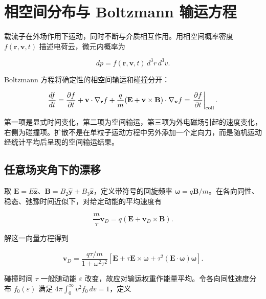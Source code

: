 \documentclass[
  11pt,
  a4paper,
  oneside,
  openany]{report}
\numberwithin{equation}{chapter}
\begin{document}
\section{相空间分布与 Boltzmann
输运方程}\label{ux76f8ux7a7aux95f4ux5206ux5e03ux4e0e-boltzmann-ux8f93ux8fd0ux65b9ux7a0b}

载流子在外场作用下运动，同时不断与介质相互作用。用相空间概率密度
\(f(\mathbf r,\mathbf v,t)\) 描述电荷云，微元内概率为

\begin{equation}
dp=f(\mathbf r,\mathbf v,t)\,d^3r\,d^3v.
\end{equation}

Boltzmann 方程将确定性的相空间输运和碰撞分开：

\begin{equation}
\frac{df}{dt}=\frac{\partial f}{\partial t}
+\mathbf v\cdot\nabla_{\mathbf r}f
+\frac{q}{m}(\mathbf E+\mathbf v\times\mathbf B)\cdot\nabla_{\mathbf v}f
=\left.\frac{\partial f}{\partial t}\right|_{\rm coll}.
\end{equation}

第一项是显式时间变化，第二项为空间输运，第三项为外电磁场引起的速度变化，右侧为碰撞项。扩散不是在单粒子运动方程中另外添加一个定向力，而是随机运动经统计平均后呈现的空间输运结果。

\subsection{任意场夹角下的漂移}\label{ux4efbux610fux573aux5939ux89d2ux4e0bux7684ux6f02ux79fb}

取
\(\mathbf E=E\hat{\mathbf z}\)、\(\mathbf B=B_2\hat{\mathbf y}+B_3\hat{\mathbf z}\)，定义带符号的回旋频率
\(\boldsymbol\omega=q\mathbf B/m\)。在各向同性、稳态、弛豫时间近似下，对给定动能的平均速度有

\begin{equation}
\frac{m}{\tau}\mathbf v_D=q(\mathbf E+\mathbf v_D\times\mathbf B).
\end{equation}

解这一向量方程得到

\begin{equation}
\mathbf v_D=\frac{q\tau/m}{1+\omega^2\tau^2}
\left[\mathbf E+\tau\mathbf E\times\boldsymbol\omega
+\tau^2(\mathbf E\cdot\boldsymbol\omega)\boldsymbol\omega\right].
\end{equation}

碰撞时间 \(\tau\) 一般随动能 \(\varepsilon\)
改变，故应对输运权重作能量平均。令各向同性速度分布 \(f_0(\varepsilon)\)
满足 \(4\pi\int_0^\infty v^2f_0\,dv=1\)，定义
\end{document}
